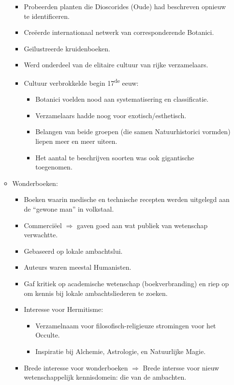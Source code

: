 \documentclass{article}
\begin{document}
\begin{itemize}
\begin{itemize}
\begin{itemize}
          \item Probeerden planten die Dioscorides (Oude) had beschreven opnieuw te identificeren.
          \item Cre\"eerde internationaal netwerk van corresponderende Botanici.
          \item Ge\"ilustreerde kruidenboeken.
          \item Werd onderdeel van de elitaire cultuur van rijke verzamelaars.
          \item Cultuur verbrokkelde begin 17\textsuperscript{de} eeuw:
          \begin{itemize}
            \item Botanici voelden nood aan systematisering en classificatie.
            \item Verzamelaars hadde noog voor exotisch/esthetisch.
            \item Belangen van beide groepen (die samen Natuurhistorici vormden) liepen meer en meer uiteen.
            \item Het aantal te beschrijven soorten was ook gigantische toegenomen.
          \end{itemize}
        \end{itemize}
        \item Wonderboeken:
        \begin{itemize}
          \item Boeken waarin medische en technische recepten werden uitgelegd aan de ``gewone man'' in volkstaal.
          \item Commerci\"eel $\Rightarrow$ gaven goed aan wat publiek van wetenschap verwachtte.
          \item Gebaseerd op lokale ambachtslui.
          \item Auteurs waren meestal Humanisten.
          \item Gaf kritiek op academische wetenschap (boekverbranding) en riep op om kennis bij lokale ambachtsliederen te zoeken.
          \item Interesse voor Hermitisme:
          \begin{itemize}
            \item Verzamelnaam voor filosofisch-religieuze stromingen voor het Occulte.
            \item Inspiratie bij Alchemie, Astrologie, en Natuurlijke Magie.
          \end{itemize}
          \item Brede interesse voor wonderboeken $\Rightarrow$ Brede intersse voor nieuw wetenschappelijk kennisdomein: die van de ambachten.

\end{itemize}
\end{itemize}
\end{itemize}
\end{document}
